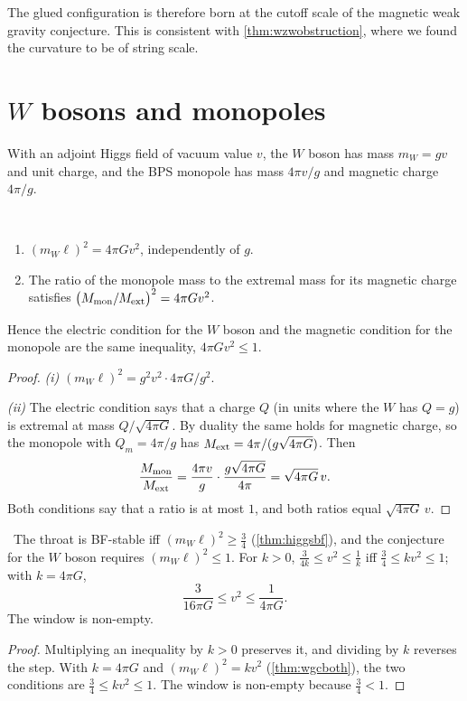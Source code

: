 The glued configuration is therefore born at the cutoff scale of the magnetic weak gravity conjecture. This is consistent with \cref{thm:wzwobstruction}, where we found the curvature to be of string scale.

\section{\texorpdfstring{$W$}{W} bosons and monopoles}

With an adjoint Higgs field of vacuum value $v$, the $W$ boson has mass $m_W=gv$ and unit charge, and the BPS monopole has mass $4\pi v/g$ and magnetic charge $4\pi/g$.

\begin{theorem}\label{thm:wgcboth}\ver\
\begin{enumerate}[label=(\roman*)]
\item $(m_W\ell)^2=4\pi Gv^2$, independently of $g$.
\item The ratio of the monopole mass to the extremal mass for its magnetic charge satisfies $\bigl(M_{\rm mon}/M_{\rm ext}\bigr)^2=4\pi Gv^2$.
\end{enumerate}
Hence the electric condition for the $W$ boson and the magnetic condition for the monopole are the same inequality, $4\pi Gv^2\le1$.
\end{theorem}
\begin{proof}
\emph{(i)} $(m_W\ell)^2=g^2v^2\cdot4\pi G/g^2$.

\emph{(ii)} The electric condition says that a charge $Q$ (in units where the $W$ has $Q=g$) is extremal at mass $Q/\sqrt{4\pi G}$. By duality the same holds for magnetic charge, so the monopole with $Q_m=4\pi/g$ has $M_{\rm ext}=4\pi/(g\sqrt{4\pi G})$. Then
\[
\frac{M_{\rm mon}}{M_{\rm ext}}=\frac{4\pi v}g\cdot\frac{g\sqrt{4\pi G}}{4\pi}=\sqrt{4\pi G}\,v .
\]
Both conditions say that a ratio is at most $1$, and both ratios equal $\sqrt{4\pi G}\,v$.
\end{proof}


\begin{theorem}[A window]\label{thm:wgcwindow}\ver\
The throat is BF-stable iff $(m_W\ell)^2\ge\frac34$ (\cref{thm:higgsbf}), and the conjecture for the $W$ boson requires $(m_W\ell)^2\le1$. For $k>0$, $\frac3{4k}\le v^2\le\frac1k$ iff $\frac34\le kv^2\le1$; with $k=4\pi G$,
\[
\frac3{16\pi G}\le v^2\le\frac1{4\pi G}.
\]
The window is non-empty.
\end{theorem}
\begin{proof}
Multiplying an inequality by $k>0$ preserves it, and dividing by $k$ reverses the step. With $k=4\pi G$ and $(m_W\ell)^2=kv^2$ (\cref{thm:wgcboth}), the two conditions are $\frac34\le kv^2\le1$. The window is non-empty because $\frac34<1$.
\end{proof}



